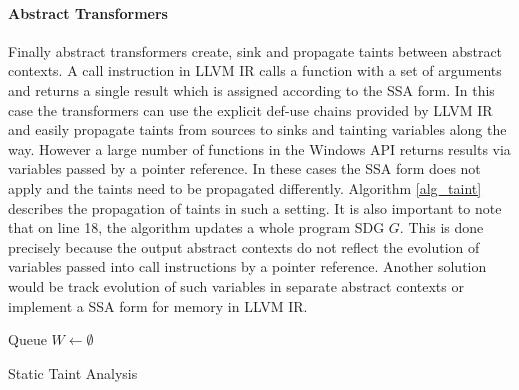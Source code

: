 \paragraph*{Abstract Transformers} Finally abstract transformers create, sink and propagate taints between abstract contexts. A call instruction in \textsc{LLVM IR} calls a function with a set of arguments and returns a single result which is assigned according to the \textsc{SSA} form. In this case the transformers can use the explicit def-use chains provided by \textsc{LLVM IR} and easily propagate taints from sources to sinks and tainting variables along the way. However a large number of functions in the Windows API returns results via variables passed by a pointer reference. In these cases the \textsc{SSA} form does not apply and the taints need to be propagated differently. Algorithm \ref{alg_taint} describes the propagation of taints in such a setting. It is also important to note that on line 18, the algorithm updates a whole program SDG $G$. This is done precisely because the output abstract contexts do not reflect the evolution of variables passed into call instructions by a pointer reference. Another solution would be track evolution of such variables in separate abstract contexts or implement a \textsc{SSA} form for memory in \textsc{LLVM IR}.

\begin{algorithm}[hbt]
\BlankLine
Queue $W \leftarrow \emptyset$\;
\caption{Static Taint Analysis}
\label{alg_taint}
\end{algorithm}

